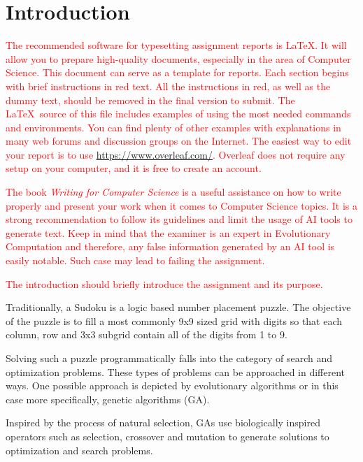 \section{Introduction}
\label{sec:intro}

\textcolor{red}{The recommended software for typesetting assignment reports is \LaTeX. It will allow you to prepare high-quality documents, especially in the area of Computer Science. This document can serve as a template for reports. Each section begins with brief instructions in red text. All the instructions in red, as well as the dummy text, should be removed in the final version to submit. The \LaTeX\ source of this file includes examples of using the most needed commands and environments. You can find plenty of other examples with explanations in many web forums and discussion groups on the Internet. The easiest way to edit your report is to use \url{https://www.overleaf.com/}. Overleaf does not require any setup on your computer, and it is free to create an account.}

\textcolor{red}{The book \textit{Writing for Computer Science} \cite{zobel2014writing} is a useful assistance on how to write properly and present your work when it comes to Computer Science topics. It is a strong recommendation to follow its guidelines and limit the usage of AI tools to generate text. Keep in mind that the examiner is an expert in Evolutionary Computation and therefore, any false information generated by an AI tool is easily notable. Such case may lead to failing the assignment.}

\textcolor{red}{The introduction should briefly introduce the assignment and its purpose.}
 
Traditionally, a Sudoku is a logic based number placement puzzle. The objective of the puzzle is to fill a most commonly 9x9 sized grid with digits so that each column, row and 3x3 subgrid contain all of the digits from 1 to 9.\cite{}

Solving such a puzzle programmatically falls into the category of search and optimization problems. These types of problems can be approached in different ways. One possible approach is depicted by evolutionary algorithms or in this case more specifically, genetic algorithms (GA)\cite{WikiSudoku}.

Inspired by the process of natural selection, GAs use biologically inspired operators such as selection, crossover and mutation to generate solutions to optimization and search problems\cite{WikiGA}.

